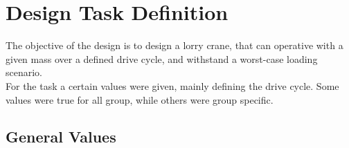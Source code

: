 \documentclass[12pt]{article}
\begin{document}
    

    \newpage
    \tableofcontents
    \newpage



    \section{Design Task Definition}

        The objective of the design is to design a lorry crane, that can operative with a given mass over a defined drive cycle, and withstand a worst-case loading scenario.\\
        For the task a certain values were given, mainly defining the drive cycle. Some values were true for all group, while others were group specific.

        \subsection{General Values}
\end{document}
